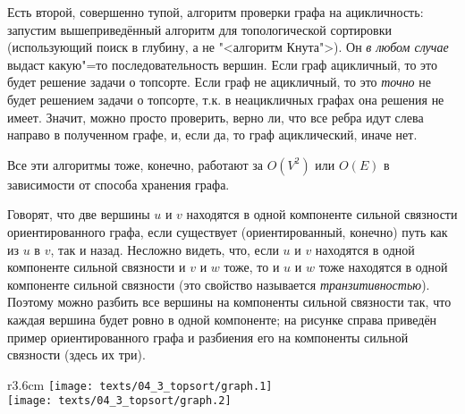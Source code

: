 Есть второй, совершенно тупой, алгоритм проверки графа на ацикличность: запустим 
вышеприведённый алгоритм для топологической сортировки (использующий поиск в глубину, а не 
"<алгоритм Кнута">). Он \textit{в любом случае} выдаст какую"=то последовательность вершин. Если 
граф ацикличный, то это будет решение задачи о топсорте. Если граф не ацикличный, то это 
\textit{точно} не будет решением задачи о топсорте, т.к. в неацикличных графах она решения не 
имеет. Значит, можно просто проверить, верно ли, что все ребра идут слева направо в полученном 
графе, и, если да, то граф ациклический, иначе нет.


Все эти алгоритмы тоже, конечно, работают за $O(V^2)$ или $O(E)$ в зависимости от способа хранения 
графа.

Говорят, что две вершины $u$ и $v$ находятся в одной компоненте сильной связности ориентированного графа, 
если существует (ориентированный, конечно) путь как из $u$ в $v$, так и назад. Несложно видеть, что, если $u$ и $v$ 
находятся в одной компоненте сильной связности и $v$ и $w$ тоже, то и $u$ и $w$ тоже находятся в одной компоненте 
сильной связности (это свойство называется \textit{транзитивностью}). Поэтому можно разбить все
вершины на компоненты сильной связности так, что каждая вершина будет ровно в одной компоненте; на
рисунке справа приведён пример ориентированного графа и разбиения его на компоненты сильной
связности (здесь их три).

\begin{wrapfigure}{r}{3.6cm}
\vspace{-0.3cm}
\texttt{[image: texts/04\_3\_topsort/graph.1]}\\[0.2cm]
\texttt{[image: texts/04\_3\_topsort/graph.2]}
\end{wrapfigure}


